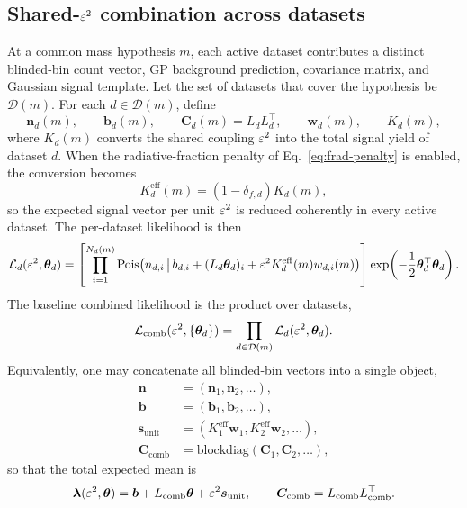 \subsection{Shared-\texorpdfstring{$\varepsilon^2$}{epsilon2} combination across datasets}
\label{sec:combination}

At a common mass hypothesis $m$, each active dataset contributes a distinct blinded-bin
count vector, GP background prediction, covariance matrix, and Gaussian signal
template. Let the set of datasets that cover the hypothesis be $\mathcal{D}(m)$. For
each $d \in \mathcal{D}(m)$, define
\begin{equation}
\bm{n}_d(m),\qquad
\bm{b}_d(m),\qquad
\bm{C}_d(m)=L_dL_d^\top,\qquad
\bm{w}_d(m),\qquad
K_d(m),
\end{equation}
where $K_d(m)$ converts the shared coupling $\varepsilon^2$ into the total signal yield of
dataset $d$. When the radiative-fraction penalty of Eq.~\eqref{eq:frad-penalty} is
enabled, the conversion becomes
\begin{equation}
K_d^{\mathrm{eff}}(m) = \left(1-\delta_{f,d}\right)K_d(m),
\label{eq:kdeff}
\end{equation}
so the expected signal vector per unit $\varepsilon^2$ is reduced coherently in every active
dataset. The per-dataset likelihood is then
\begin{equation}
\mathcal{L}_d(\varepsilon^2,\bm{\theta}_d)
=
\left[
\prod_{i=1}^{N_d(m)}
\mathrm{Pois}\!\left(
n_{d,i}\,\middle|\,
b_{d,i} + (L_d\bm{\theta}_d)_i + \varepsilon^2 K_d^{\mathrm{eff}}(m) w_{d,i}(m)
\right)
\right]
\exp\!\left(-\frac{1}{2}\bm{\theta}_d^\top\bm{\theta}_d\right).
\label{eq:dataset-poi-like}
\end{equation}
The baseline combined likelihood is the product over datasets,
\begin{equation}
\mathcal{L}_{\mathrm{comb}}(\varepsilon^2,\{\bm{\theta}_d\})
= \prod_{d \in \mathcal{D}(m)} \mathcal{L}_d(\varepsilon^2,\bm{\theta}_d).
\label{eq:combinedlike-product}
\end{equation}
Equivalently, one may concatenate all blinded-bin vectors into a single object,
\begin{align}
\bm{n} &=
\left(\bm{n}_1,\bm{n}_2,\ldots\right), \\
\bm{b} &=
\left(\bm{b}_1,\bm{b}_2,\ldots\right), \\
\bm{s}_{\mathrm{unit}} &=
\left(K_1^{\mathrm{eff}}\bm{w}_1, K_2^{\mathrm{eff}}\bm{w}_2,\ldots\right), \\
\bm{C}_{\mathrm{comb}} &=
\mathrm{blockdiag}(\bm{C}_1,\bm{C}_2,\ldots),
\end{align}
so that the total expected mean is
\begin{equation}
\bm{\lambda}(\varepsilon^2,\bm{\theta})
= \bm{b} + L_{\mathrm{comb}}\bm{\theta} + \varepsilon^2\bm{s}_{\mathrm{unit}},
\qquad
\bm{C}_{\mathrm{comb}} = L_{\mathrm{comb}}L_{\mathrm{comb}}^\top.
\end{equation}

